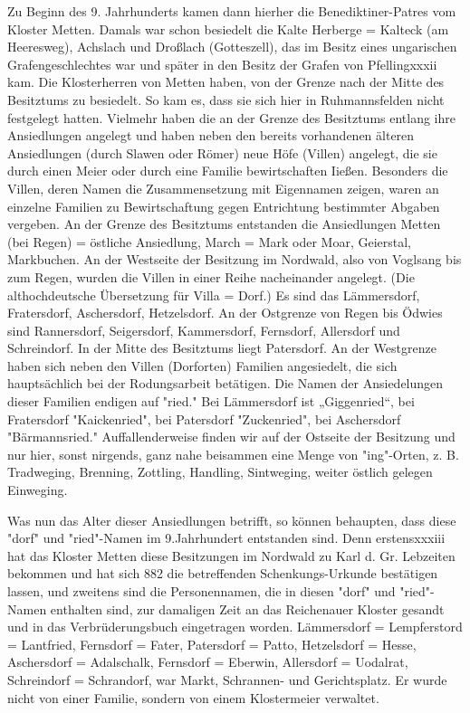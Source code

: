 \documentclass{book}
\begin{document}
Zu Beginn des 9. Jahrhunderts kamen dann hierher die Benediktiner-Patres vom
Kloster Metten. Damals war schon besiedelt die Kalte Herberge = Kalteck (am
Heeresweg), Achslach und Droßlach (Gotteszell), das im Besitz eines ungarischen
Grafengeschlechtes war und später in den Besitz der Grafen von Pfellingxxxii
kam. Die Klosterherren von Metten haben, von der Grenze nach der Mitte des
Besitztums zu besiedelt. So kam es, dass sie sich hier in Ruhmannsfelden nicht
festgelegt hatten. Vielmehr haben die an der Grenze des Besitztums entlang ihre
Ansiedlungen angelegt und haben neben den bereits vorhandenen älteren
Ansiedlungen (durch Slawen oder Römer) neue Höfe (Villen) angelegt, die sie
durch einen Meier oder durch eine Familie bewirtschaften Iießen. Besonders die
Villen, deren Namen die Zusammensetzung mit Eigennamen zeigen, waren an einzelne
Familien zu Bewirtschaftung gegen Entrichtung bestimmter Abgaben vergeben. An
der Grenze des Besitztums entstanden die Ansiedlungen Metten (bei Regen) =
östliche Ansiedlung, March = Mark oder Moar, Geierstal, Markbuchen. An der
Westseite der Besitzung im Nordwald, also von Voglsang bis zum Regen, wurden die
Villen in einer Reihe nacheinander angelegt. (Die althochdeutsche Übersetzung
für Villa = Dorf.) Es sind das Lämmersdorf, Fratersdorf, Aschersdorf,
Hetzelsdorf. An der Ostgrenze von Regen bis Ödwies sind Rannersdorf,
Seigersdorf, Kammersdorf, Fernsdorf, Allersdorf und Schreindorf. In der Mitte
des Besitztums liegt Patersdorf. An der Westgrenze haben sich neben den Villen
(Dorforten) Familien angesiedelt, die sich hauptsächlich bei der Rodungsarbeit
betätigen. Die Namen der Ansiedelungen dieser Familien endigen auf "ried." Bei
Lämmersdorf ist „Giggenried“, bei Fratersdorf "Kaickenried", bei Patersdorf
"Zuckenried", bei Aschersdorf "Bärmannsried." Auffallenderweise finden wir auf
der Ostseite der Besitzung und nur hier, sonst nirgends, ganz nahe beisammen
eine Menge von "ing"-Orten, z. B. Tradweging, Brenning, Zottling, Handling,
Sintweging, weiter östlich gelegen Einweging.

Was nun das Alter dieser Ansiedlungen betrifft, so können behaupten, dass diese
"dorf" und "ried"-Namen im 9.Jahrhundert entstanden sind. Denn erstensxxxiii hat
das Kloster Metten diese Besitzungen im Nordwald zu Karl d. Gr. Lebzeiten
bekommen und hat sich 882 die betreffenden Schenkungs-Urkunde bestätigen lassen,
und zweitens sind die Personennamen, die in diesen "dorf" und "ried"-Namen
enthalten sind, zur damaligen Zeit an das Reichenauer Kloster gesandt und in das
Verbrüderungsbuch eingetragen worden. Lämmersdorf = Lempferstord = Lantfried,
Fernsdorf = Fater, Patersdorf = Patto, Hetzelsdorf = Hesse, Aschersdorf =
Adalschalk, Fernsdorf = Eberwin, Allersdorf = Uodalrat, Schreindorf =
Schrandorf, war Markt, Schrannen- und Gerichtsplatz. Er wurde nicht von einer
Familie, sondern von einem Klostermeier verwaltet.
\end{document}
